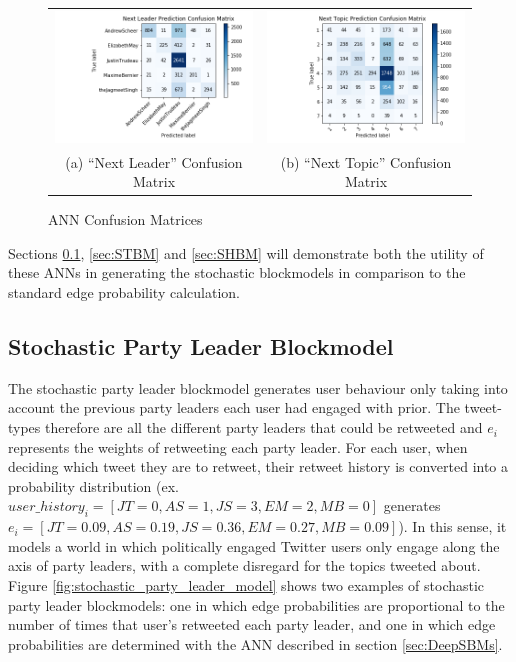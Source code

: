 \begin{singlespacing}
    \begin{figure}
        \centering
        \begin{tabular}{cc}
          \includegraphics[width=60mm]{Figures/next_leader_CM}
          &
          \includegraphics[width=60mm]{Figures/next_topic_CM}
          \\
        (a) ``Next Leader'' Confusion Matrix & (b) ``Next Topic'' Confusion Matrix \\[6pt]
        \end{tabular}
        \caption[ANN Confusion Matrices]{ANN Confusion Matrices}
        \label{fig:confusion_matrices}
    \end{figure}
\end{singlespacing}

Sections \ref{sec:SPLBM}, \ref{sec:STBM} and \ref{sec:SHBM} will demonstrate
both the utility of these ANNs in generating the stochastic blockmodels in
comparison to the standard edge probability calculation.

\subsection{Stochastic Party Leader Blockmodel}\label{sec:SPLBM}

The stochastic party leader blockmodel generates user behaviour only taking into
account the previous party leaders each user had engaged with prior. The
tweet-types therefore are all the different party leaders that could be
retweeted and $e_{i}$ represents the weights of retweeting each party leader.
For each user, when deciding which tweet they are to retweet, their retweet
history is converted into a probability distribution (ex.\
$user\_history_{i}=[JT=0,AS=1,JS=3,EM=2,MB=0]$ generates
$e_{i}=[JT=0.09,AS=0.19,JS=0.36,EM=0.27,MB=0.09]$). In this sense, it models a
world in which politically engaged Twitter users only engage along the axis of
party leaders, with a complete disregard for the topics tweeted about. Figure
\ref{fig:stochastic_party_leader_model} shows two examples of stochastic party
leader blockmodels: one in which edge probabilities are proportional to the
number of times that user's retweeted each party leader, and one in which edge
probabilities are determined with the ANN described in section
\ref{sec:DeepSBMs}.

